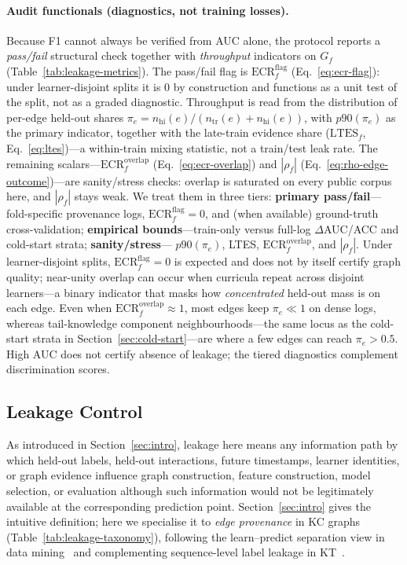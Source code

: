 \documentclass[preprint,10pt,doubleblind]{elsarticle}
\newcommand{\KC}{knowledge component}
\begin{document}
\paragraph{Audit functionals (diagnostics, not training losses).}
Because F1 cannot always be verified from AUC alone, the protocol
reports a \emph{pass/fail} structural check together with
\emph{throughput} indicators on $G_f$ (Table~\ref{tab:leakage-metrics}).
The pass/fail flag is $\mathrm{ECR}^{\mathrm{flag}}_f$ (Eq.~\eqref{eq:ecr-flag}):
under learner-disjoint splits it is $0$ by construction and functions as a
unit test of the split, not as a graded diagnostic.
Throughput is read from the distribution of per-edge held-out shares
$\pi_e=n_{\mathrm{hi}}(e)/(n_{\mathrm{tr}}(e)+n_{\mathrm{hi}}(e))$, with
$p90(\pi_e)$ as the primary indicator, together with the late-train evidence
share ($\mathrm{LTES}_f$, Eq.~\eqref{eq:ltes})---a within-train mixing
statistic, not a train/test leak rate.
The remaining scalars---$\mathrm{ECR}^{\mathrm{overlap}}_f$
(Eq.~\eqref{eq:ecr-overlap}) and $|\rho_f|$ (Eq.~\eqref{eq:rho-edge-outcome})---are
sanity/stress checks: overlap is saturated on every public corpus here, and
$|\rho_f|$ stays weak.
We treat them in three tiers:
\textbf{primary pass/fail}---fold-specific provenance logs,
$\mathrm{ECR}^{\mathrm{flag}}_f{=}0$, and (when available) ground-truth
cross-validation; \textbf{empirical bounds}---train-only versus full-log
$\Delta$AUC/ACC and cold-start strata; \textbf{sanity/stress}---
$p90(\pi_e)$, LTES, $\mathrm{ECR}^{\mathrm{overlap}}_f$, and $|\rho_f|$.
Under learner-disjoint splits, $\mathrm{ECR}^{\mathrm{flag}}_f{=}0$ is
expected and does not by itself certify graph quality; near-unity overlap
can occur when curricula repeat across disjoint learners---a binary indicator
that masks how \emph{concentrated} held-out mass is on each edge.
Even when $\mathrm{ECR}^{\mathrm{overlap}}_f{\approx}1$, most edges keep $\pi_e\ll1$ on
dense logs, whereas tail-\KC{} neighbourhoods---the same locus as the cold-start
strata in Section~\ref{sec:cold-start}---are where a few edges can reach
$\pi_e>0.5$. High AUC does not certify absence of leakage; the
tiered diagnostics complement discrimination scores.

\subsection{Leakage Control}
\label{sec:leakage}
As introduced in Section~\ref{sec:intro}, leakage here means any
information path by which held-out labels, held-out interactions, future
timestamps, learner identities, or graph evidence influence graph
construction, feature construction, model selection, or evaluation although
such information would not be legitimately available at the corresponding
prediction point. Section~\ref{sec:intro} gives the intuitive definition;
here we specialise it to \emph{edge provenance} in KC graphs
(Table~\ref{tab:leakage-taxonomy}), following the learn--predict separation
view in data mining~\cite{kaufman2012leakage,kapoor2023leakage} and
complementing sequence-level label leakage in KT~\cite{liu2022pykt,badran2024labelleakage}.
\end{document}
